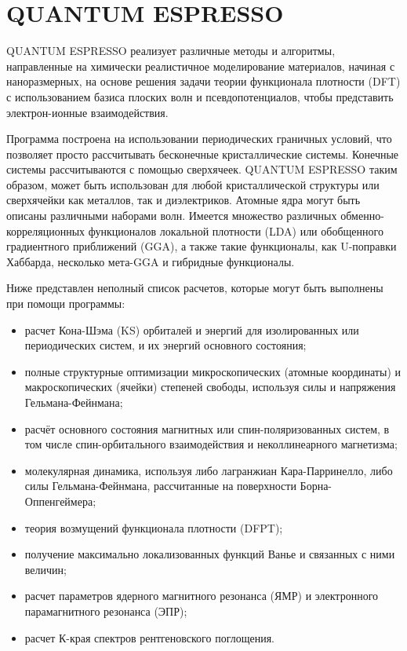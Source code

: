 \section{QUANTUM ESPRESSO}
QUANTUM ESPRESSO реализует различные методы и алгоритмы, направленные на химически реалистичное моделирование материалов, начиная с наноразмерных, на основе решения задачи теории функционала плотности (DFT) с использованием базиса плоских волн и псевдопотенциалов, чтобы представить электрон-ионные взаимодействия.

Программа построена на использовании периодических граничных условий, что позволяет просто рассчитывать бесконечные кристаллические системы. Конечные системы рассчитываются с помощью сверхячеек. QUANTUM ESPRESSO таким образом, может быть использован для любой кристаллической структуры или сверхячейки как металлов, так и диэлектриков. Атомные ядра могут быть описаны различными наборами волн. Имеется множество различных обменно-корреляционных функционалов локальной плотности (LDA) или обобщенного градиентного приближений (GGA), а также такие функционалы, как U-поправки Хаббарда, несколько мета-GGA и гибридные функционалы.

Ниже представлен неполный список расчетов, которые могут быть выполнены при помощи программы\cite{qe}:
\begin{itemize}
    \item расчет Кона-Шэма (KS) орбиталей и энергий для изолированных или периодических систем, и их энергий основного состояния;
    \item полные структурные оптимизации микроскопических (атомные координаты) и макроскопических (ячейки) степеней свободы, используя силы и напряжения Гельмана-Фейнмана;
    \item расчёт основного состояния магнитных или спин-поляризованных систем, в том числе спин-орбитального взаимодействия и неколлинеарного магнетизма;
    \item молекулярная динамика, используя либо лагранжиан Кара-Парринелло, либо силы Гельмана-Фейнмана, рассчитанные на поверхности Борна-Оппенгеймера;
    \item теория возмущений функционала плотности (DFPT);
    \item получение максимально локализованных функций Ванье и связанных с ними величин;
    \item расчет параметров ядерного магнитного резонанса (ЯМР) и электронного парамагнитного резонанса (ЭПР);
    \item расчет К-края спектров рентгеновского поглощения.
\end{itemize}
